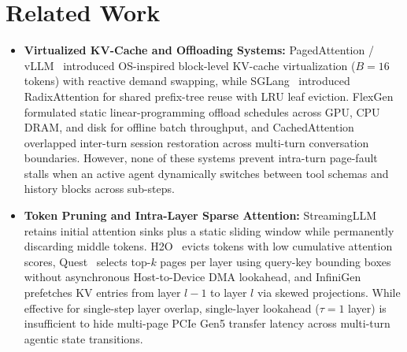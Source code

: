 \documentclass[conference,10pt]{IEEEtran}
\begin{document}
\section{Related Work}
\begin{itemize}
    \item \textbf{Virtualized KV-Cache and Offloading Systems:} PagedAttention / vLLM~\cite{kwon2023efficient} introduced OS-inspired block-level KV-cache virtualization ($B=16$ tokens) with reactive demand swapping, while SGLang~\cite{zheng2024sglang} introduced RadixAttention for shared prefix-tree reuse with LRU leaf eviction. FlexGen~\cite{sheng2023flexgen} formulated static linear-programming offload schedules across GPU, CPU DRAM, and disk for offline batch throughput, and CachedAttention~\cite{gao2024cachedattention} overlapped inter-turn session restoration across multi-turn conversation boundaries. However, none of these systems prevent intra-turn page-fault stalls when an active agent dynamically switches between tool schemas and history blocks across sub-steps.
    \item \textbf{Token Pruning and Intra-Layer Sparse Attention:} StreamingLLM~\cite{xiao2023efficient} retains initial attention sinks plus a static sliding window while permanently discarding middle tokens. H2O~\cite{zhang2023h2o} evicts tokens with low cumulative attention scores, Quest~\cite{tang2024quest} selects top-$k$ pages per layer using query-key bounding boxes without asynchronous Host-to-Device DMA lookahead, and InfiniGen~\cite{lee2024infinigen} prefetches KV entries from layer $l-1$ to layer $l$ via skewed projections. While effective for single-step layer overlap, single-layer lookahead ($\tau=1$ layer) is insufficient to hide multi-page PCIe Gen5 transfer latency across multi-turn agentic state transitions.

\end{itemize}
\end{document}
